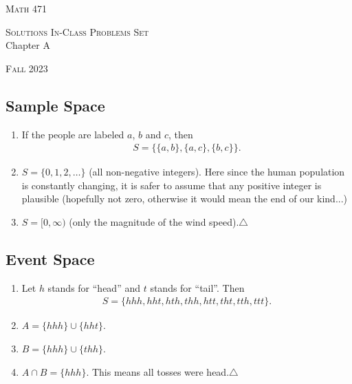


\hrulefill

\begin{minipage}{0.2\textwidth}
\textsc{Math 471}
\end{minipage} \hfill 
\begin{minipage}{0.55\textwidth}
\centering
\textsc{Solutions In-Class Problems Set} \\
Chapter A
\end{minipage}
 \hfill 
 \begin{minipage}{0.2\textwidth}
 \flushright \textsc{Fall 2023}
 \end{minipage}

\hrulefill

\setcounter{section}{1}

\subsection{Sample Space}
	
	\begin{problem}
	\begin{enumerate}[label=\alph*)]
	\item If the people are labeled $a$, $b$ and $c$, then
		\begin{align*}
		S = \{ \{ a , b \} , \{ a , c \} , \{ b , c \} \} .
		\end{align*}
	\item $S = \{ 0 , 1, 2, \ldots \}$ (all non-negative integers). Here since the human population is constantly changing, it is safer to assume that any positive integer is plausible (hopefully not zero, otherwise it would mean the end of our kind...)
	\item $S = [0, \infty )$ (only the magnitude of the wind speed).\hfill$\triangle$
	\end{enumerate}
	\end{problem}
	
	\subsection{Event Space}
	
	\begin{problem}
	\begin{enumerate}[label=\alph*)]
	\item Let $h$ stands for ``head'' and $t$ stands for ``tail''. Then
		\begin{align*}
		S = \{ hhh, hht, hth, thh, htt, tht, tth, ttt \} .
		\end{align*}
	\item $A = \{ hhh \} \cup \{ hht \}$.
	\item $B = \{ hhh \} \cup \{ thh \}$.
	\item $A \cap B = \{ hhh \}$. This means all tosses were head.\hfill$\triangle$
	\end{enumerate}
	\end{problem}
	
